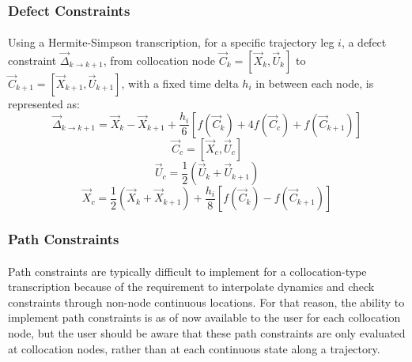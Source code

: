 \subsubsection{Defect Constraints}
\paragraph{}
Using a Hermite-Simpson transcription, for a specific trajectory leg $i$, a defect constraint $\vec{\Delta}_{k \rightarrow k+1}$, from collocation node $\vec{C}_k=[\vec{X}_k,\vec{U}_k]$ to $\vec{C}_{k+1} = [\vec{X}_{k+1},\vec{U}_{k+1}]$, with a fixed time delta $h_i$ in between each node, is represented as:
\begin{equation}
\vec{\Delta}_{k \rightarrow k+1} = 
\vec{X}_k - \vec{X}_{k+1} + 
\frac{h_i}{6}\left[
f(\vec{C}_k) + 4 f(\vec{C}_c) + f(\vec{C}_{k+1})
\right]
\end{equation}
\begin{equation}
\vec{C}_c = [\vec{X}_c, \vec{U}_c]
\end{equation}
\begin{equation}
\vec{U}_c = \frac{1}{2}\left(\vec{U}_k + \vec{U}_{k+1}\right)
\end{equation}
\begin{equation}
\vec{X}_c = \frac{1}{2} \left(
\vec{X}_k + \vec{X}_{k+1}
\right) + \frac{h_i}{8} \left[
f(\vec{C}_k) - f(\vec{C}_{k+1})
\right]
\end{equation}
\subsubsection{Path Constraints}
\paragraph{}
Path constraints are typically difficult to implement for a collocation-type transcription because of the requirement to interpolate dynamics and check constraints through non-node continuous locations. For that reason, the ability to implement path constraints is as of now available to the user for each collocation node, but the user should be aware that these path constraints are only evaluated at collocation nodes, rather than at each continuous state along a trajectory.
